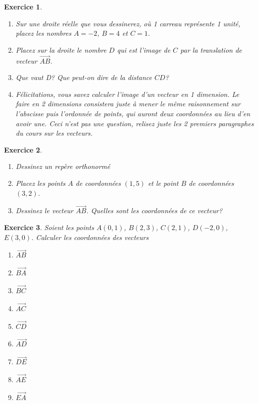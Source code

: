 \documentclass[10pt,a4paper]{article}
\newtheorem{exo}{Exercice}
\begin{document}
\begin{exo}
    \begin{enumerate}
        \item Sur une droite réelle que vous dessinerez, où 1 carreau représente 1 unité, placez les nombres $A=-2$, $B=4$ et $C=1$.
        \item Placez sur la droite le nombre $D$ qui est l'image de $C$ par la translation de vecteur $\overrightarrow{AB}$.
        \item Que vaut D? Que peut-on dire de la distance $CD$?
        \item Félicitations, vous savez calculer l'image d'un vecteur en 1 dimension. Le faire en 2 dimensions consistera juste à mener le même raisonnement sur l'abscisse puis l'ordonnée de points, qui auront deux coordonnées au lieu d'en avoir une. Ceci n'est pas une question, relisez juste les 2 premiers paragraphes du cours sur les vecteurs.
    \end{enumerate}
\end{exo}

\begin{exo}
    \begin{enumerate}
        \item Dessinez un repère orthonormé
        \item Placez les points $A$ de coordonnées $(1,5)$ et le point $B$ de coordonnées $(3,2)$.
        \item Dessinez le vecteur $\overrightarrow{AB}$. Quelles sont les coordonnées de ce vecteur?
    \end{enumerate}
\end{exo}

\newcommand*{\Coord}[2]{%
  \ensuremath{ 
    \begin{pmatrix} 
      #1\\ 
      #2 
    \end{pmatrix}}}


\begin{exo}
    Soient les points $A(0,1)$, $B(2,3)$, $C(2,1)$, $D(-2,0)$, $E(3,0)$. Calculer les coordonnées des vecteurs
    \begin{multicols}{3}
        \begin{enumerate}
            \item $\overrightarrow{AB}$
            \item $\overrightarrow{BA}$
            \item $\overrightarrow{BC}$
            \item $\overrightarrow{AC}$
            \item $\overrightarrow{CD}$
            \item $\overrightarrow{AD}$
            \item $\overrightarrow{DE}$
            \item $\overrightarrow{AE}$
            \item $\overrightarrow{EA}$
        \end{enumerate}
    \end{multicols}
\end{exo}
\end{document}
